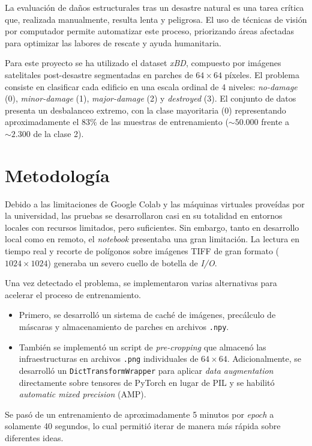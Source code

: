 \documentclass[11pt, a4paper]{article}
\begin{document}
La evaluación de daños estructurales tras un desastre natural es una tarea crítica que, realizada manualmente, resulta lenta y peligrosa. El uso de técnicas de visión por computador permite automatizar este proceso, priorizando áreas afectadas para optimizar las labores de rescate y ayuda humanitaria.

Para este proyecto se ha utilizado el dataset \textit{xBD}, compuesto por imágenes satelitales post-desastre segmentadas en parches de $64\times64$ píxeles. El problema consiste en clasificar cada edificio en una escala ordinal de 4 niveles: \textit{no-damage} (0), \textit{minor-damage} (1), \textit{major-damage} (2) y \textit{destroyed} (3). El conjunto de datos presenta un desbalanceo extremo, con la clase mayoritaria (0) representando aproximadamente el 83\% de las muestras de entrenamiento ($\sim 50.000$ frente a $\sim 2.300$ de la clase 2).

\section{Metodología}

Debido a las limitaciones de Google Colab y las máquinas virtuales proveídas por la universidad, las pruebas se desarrollaron casi en su totalidad en entornos locales con recursos limitados, pero suficientes. Sin embargo, tanto en desarrollo local como en remoto, el \textit{notebook} presentaba una gran limitación. La lectura en tiempo real y recorte de polígonos sobre imágenes TIFF de gran formato ($1024\times1024$) generaba un severo cuello de botella de \textit{I/O}.

Una vez detectado el problema, se implementaron varias alternativas para acelerar el proceso de entrenamiento. 

\begin{itemize}
  \item Primero, se desarrolló un sistema de caché de imágenes, precálculo de máscaras y almacenamiento de parches en archivos \texttt{.npy}. 
  \item También se implementó un script de \textit{pre-cropping} que almacenó las infraestructuras en archivos \texttt{.png} individuales de $64\times64$. Adicionalmente, se desarrolló un \texttt{DictTransformWrapper} para aplicar \textit{data augmentation} directamente sobre tensores de PyTorch en lugar de PIL y se habilitó \textit{automatic mixed precision} (AMP). \end{itemize}

Se pasó de un entrenamiento de aproximadamente 5 minutos por \textit{epoch} a solamente 40 segundos, lo cual permitió iterar de manera más rápida sobre diferentes ideas. 
\end{document}
